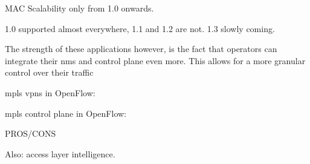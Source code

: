 MAC Scalability only from 1.0 onwards.

1.0 supported almost everywhere, 1.1 and 1.2 are not. 1.3 slowly coming.

The strength of these applications however, is the fact that operators can integrate their \ac{nms} and control plane even more. This allows for a more granular control over their traffic

\ac{mpls} \acp{vpn} in OpenFlow: \cite{mpls-vpn-openflow}

\ac{mpls} control plane in OpenFlow: \cite{mpls-open}


PROS/CONS


Also: access layer intelligence.

